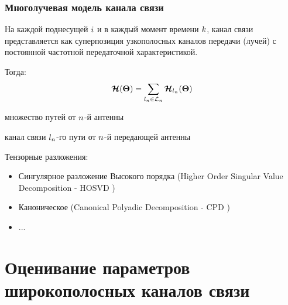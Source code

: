 \begin{frame}
	\frametitle{Многолучевая модель канала связи}
	
	\begin{assumption}
		\label{as:1}
		На каждой поднесущей $i$ и в каждый момент времени $k$, канал связи представляется как суперпозиция узкополосных каналов передачи (лучей) с постоянной частотной передаточной характеристикой.
	\end{assumption}
	
	Тогда:
	\begin{equation}
	\label{eq:3}
	\boldsymbol{\mathcal H}({\boldsymbol{\Theta}})=\sum_{{l_{n}}\in{{\mathcal L}_{n}}} \boldsymbol{\mathcal H}_{l_{n}}({\boldsymbol{\Theta}})
	\end{equation}
		
	\begin{description}
		\item[$\Spai$] множество путей от ${n}$-й антенны
		\item[$\ten{H}_\pai(\pars)$] канал связи ${l_{n}}$-го пути от ${n}$-й передающей антенны
	\end{description}

	Тензорные разложения: 
	\begin{itemize}
		\item Сингулярное разложение Высокого порядка (Higher Order Singular Value Decomposition - HOSVD \cite{Haardt08})
		\item Каноническое (Canonical Polyadic Decomposition - CPD \cite{Bros99, Roemer13})
		\item ...
	\end{itemize}
\end{frame}

\section{Оценивание параметров широкополосных каналов связи}

